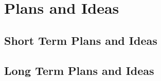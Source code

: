 \chapter{Plans and Ideas}

\section{Short Term Plans and Ideas}

\section{Long Term Plans and Ideas}

